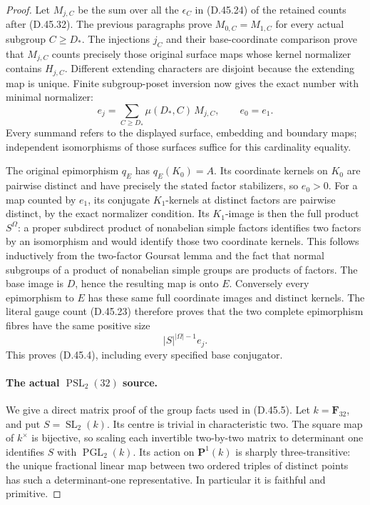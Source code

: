\begin{proof}
Let \(M_{j,C}\) be the sum over all the
\(\epsilon_C\) in \textup{(D.45.24)} of the
retained counts after \textup{(D.45.32)}.
The previous paragraphs prove
\(M_{0,C}=M_{1,C}\) for every actual subgroup
\(C\geq D_*\).
The injections \(j_C\) and their base-coordinate
comparison prove that \(M_{j,C}\) counts precisely
those original surface maps whose kernel
normalizer contains \(H_{j,C}\).
Different extending characters are disjoint
because the extending map is unique.
Finite subgroup-poset inversion now gives the
exact number with minimal normalizer:
\[
        e_j=\sum_{C\geq D_*}\mu(D_*,C)\,M_{j,C},
                    \qquad e_0=e_1.
 \tag{D.45.35}
\]
Every summand refers to the displayed surface,
embedding and boundary maps; independent
isomorphisms of those surfaces suffice for this
cardinality equality.

The original epimorphism \(q_E\) has
\(q_E(K_0)=A\). Its coordinate kernels on
\(K_0\) are pairwise distinct and have precisely
the stated factor stabilizers, so \(e_0>0\).
For a map counted by \(e_1\), its conjugate
\(K_1\)-kernels at distinct factors are pairwise
distinct, by the exact normalizer condition.
Its \(K_1\)-image is then the full product
\(S^\Omega\): a proper subdirect product of
nonabelian simple factors identifies two factors
by an isomorphism and would identify those two
coordinate kernels. This follows inductively
from the two-factor Goursat lemma and the fact
that normal subgroups of a product of
nonabelian simple groups are products of factors.
The base image is \(D\), hence the resulting
map is onto \(E\).
Conversely every epimorphism to \(E\) has these
same full coordinate images and distinct
kernels.
The literal gauge count
\textup{(D.45.23)} therefore proves that the
two complete epimorphism fibres have the same
positive size
\[
                         |S|^{|\Omega|-1}e_j .
 \tag{D.45.36}
\]
This proves \textup{(D.45.4)}, including every
specified base conjugator.

\paragraph{The actual \(\operatorname{PSL}_2(32)\) source.}
We give a direct matrix proof of the group facts
used in \textup{(D.45.5)}.
Let \(k=\mathbf F_{32}\), and put \(S=\operatorname{SL}_2(k)\).
Its centre is trivial in characteristic two.
The square map of \(k^\times\) is bijective, so scaling
each invertible two-by-two matrix to determinant one
identifies \(S\) with \(\operatorname{PGL}_2(k)\).
Its action on \(\mathbf P^1(k)\) is sharply
three-transitive: the unique fractional linear map
between two ordered triples of distinct points has
such a determinant-one representative.
In particular it is faithful and primitive.


\end{proof}
